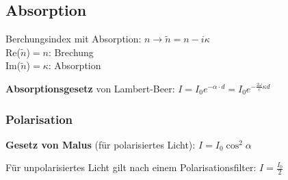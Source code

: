 \begin{sectionbox}
    \subsection{Absorption}
    Berchungsindex mit Absorption: $n\rightarrow \tilde{n}=n-i\kappa$\\
    Re($\tilde{n}$)$=n$: Brechung \\
    Im($\tilde{n}$)$=\kappa$: Absorption \\

    \begin{emphbox}
        \textbf{Absorptionsgesetz} von Lambert-Beer: $I=I_0e^{-\alpha \cdot d}=I_0e^{-\frac{2\omega}{c}\kappa d}$
    \end{emphbox}

    \subsubsection{Polarisation}
    \begin{emphbox}
        \textbf{Gesetz von Malus} (für polarisiertes Licht): $I = I_0 \cos^2 \alpha$
    \end{emphbox}
    Für unpolarisiertes Licht gilt nach einem Polarisationsfilter: $I = \frac{I_0}{2}$
\end{sectionbox}
